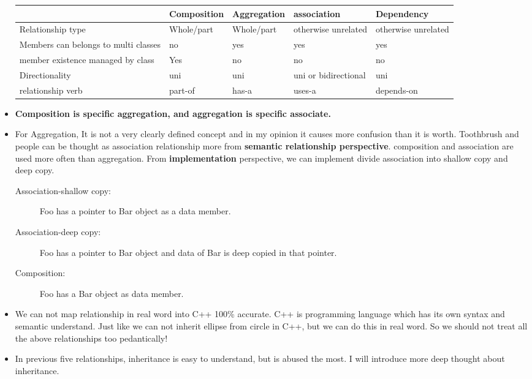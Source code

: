 \documentclass[a4paper,11pt,twoside]{book}
\newcommand{\tophline}{\hline }
\newcommand{\bottomhline}{\\ \hline }
\newcommand{\tophline}{ }
\newcommand{\bottomhline}{ }
\begin{document}
\begin{itemize}
	
\begin{center}
	\begin{tabular}{|p{}|p{}|p{}|p{}|p{}|}
		\tophline 
		 & Composition  & Aggregation  & association & Dependency \\ 
		\tophline 
		Relationship type& Whole/part  & Whole/part  & otherwise unrelated  & otherwise unrelated  \\ 
		\tophline 
		Members can belongs to multi classes& no  & yes & yes & yes  \\ 
		\tophline 
		member existence managed by class& Yes & no & no   & no \\ 
		\tophline 
		Directionality & uni  & uni & uni or bidirectional & uni  \\ 
		\tophline 
		relationship verb& part-of & has-a & uses-a & depends-on 
		\bottomhline 
	\end{tabular}
\end{center}

	\item \textbf{Composition is specific aggregation, and aggregation is specific associate.}

	\item For Aggregation, It is not a very clearly defined concept and in my opinion it causes more confusion than it is worth. Toothbrush and people can be thought as association relationship more from \textbf{semantic relationship perspective}. composition and association are used more often than aggregation. From \textbf{implementation} perspective,  we can implement divide association into shallow copy and deep copy. 
	
	\begin{description}
		\item[Association-shallow copy:] Foo has a pointer to Bar object as a data member.
		\item[Association-deep copy:] Foo has a pointer to Bar object and data of Bar is deep copied in that pointer.
		\item[Composition:] Foo has a Bar object as data member.
	\end{description}

	\item We can not map relationship in real word into C++ 100\% accurate. C++ is programming language which has its own syntax and semantic understand. Just like we can not inherit ellipse from circle in C++, but we can do this in real word. So we should not treat all the above relationships too pedantically! 

    \item In previous five relationships, inheritance is easy to understand, but is abused the most. I will introduce more deep thought about inheritance. 
	
\end{itemize}
\end{document}
